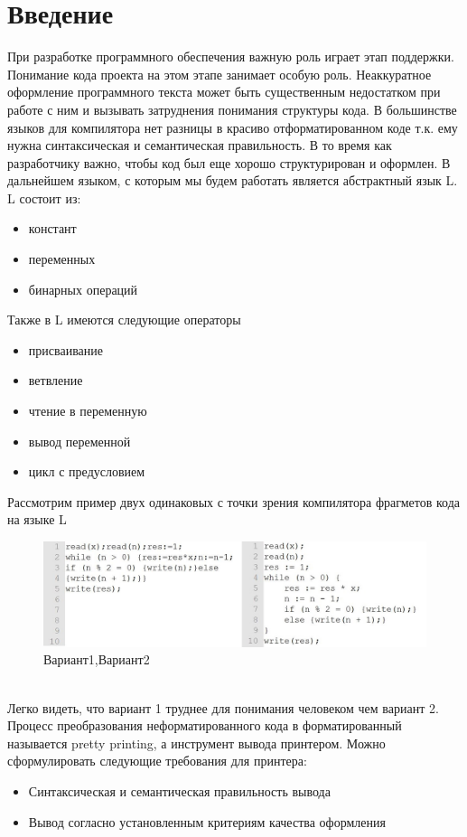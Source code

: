 \documentclass{matmex-diploma}
\begin{document}
\section*{Введение}
При разработке программного обеспечения важную роль играет этап поддержки. Понимание кода проекта на этом этапе занимает особую роль. Неаккуратное оформление программного текста может быть существенным недостатком при работе с ним и вызывать затруднения понимания структуры кода. В большинстве языков для компилятора нет разницы в красиво отформатированном коде т.к. ему нужна синтаксическая и семантическая правильность. В то время как разработчику важно, чтобы код был еще хорошо структурирован и оформлен.
    В дальнейшем языком, с которым мы будем работать является абстрактный язык L.
L состоит из:
\begin{itemize}
    \item констант
    \item переменных
    \item бинарных операций
\end{itemize}
Также в L имеются следующие операторы
\begin{itemize}
    \item присваивание
    \item ветвление
    \item чтение в переменную
    \item вывод переменной
    \item цикл с предусловием
\end{itemize}
Рассмотрим пример двух одинаковых с точки зрения компилятора фрагметов кода на языке L
\begin{figure}[h]
    \centering
    \includegraphics[scale=0.6]{Images/image01.png}
    \caption{Вариант1,Вариант2}
\end{figure}
\\Легко видеть, что вариант 1 труднее для понимания человеком чем вариант 2. Процесс преобразования неформатированного кода в форматированный называется  pretty printing, а инструмент вывода принтером.
Можно сформулировать следующие требования для принтера:
\begin{itemize}
    \item Синтаксическая и семантическая правильность вывода 
    \item Вывод согласно установленным критериям качества оформления
\end{itemize}
\end{document}
